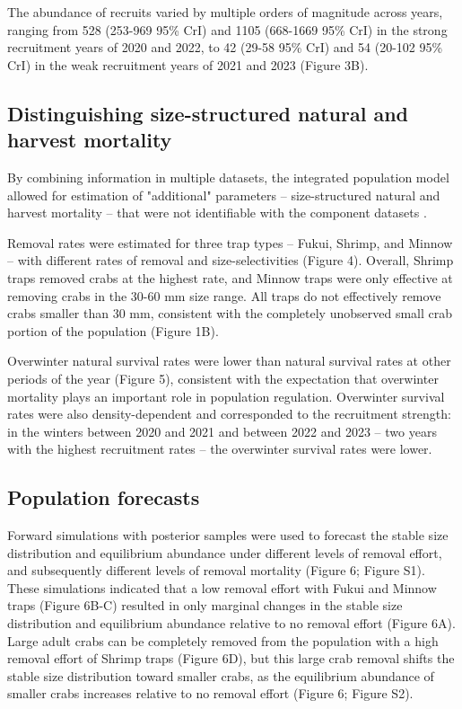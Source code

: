 \documentclass{article}
\begin{document}
The abundance of recruits varied by multiple orders of magnitude across years, ranging from 528 (253-969 95\% CrI) and 1105 (668-1669 95\% CrI) in the strong recruitment years of 2020 and 2022, to 42 (29-58 95\% CrI) and 54 (20-102 95\% CrI) in the weak recruitment years of 2021 and 2023 (Figure 3B).

\subsection{Distinguishing size-structured natural and harvest mortality}

By combining information in multiple datasets, the integrated population model allowed for estimation of "additional" parameters -- size-structured natural and harvest mortality -- that were not identifiable with the component datasets \parencite{riecke2019integrated}.

Removal rates were estimated for three trap types -- Fukui, Shrimp, and Minnow -- with different rates of removal and size-selectivities (Figure 4). Overall, Shrimp traps removed crabs at the highest rate, and Minnow traps were only effective at removing crabs in the 30-60 mm size range. All traps do not effectively remove crabs smaller than 30 mm, consistent with the completely unobserved small crab portion of the population (Figure 1B).

Overwinter natural survival rates were lower than natural survival rates at other periods of the year (Figure 5), consistent with the expectation that overwinter mortality plays an important role in population regulation. Overwinter survival rates were also density-dependent and corresponded to the recruitment strength: in the winters between 2020 and 2021 and between 2022 and 2023 -- two years with the highest recruitment rates -- the overwinter survival rates were lower.

\subsection{Population forecasts}

Forward simulations with posterior samples were used to forecast the stable size distribution and equilibrium abundance under different levels of removal effort, and subsequently different levels of removal mortality (Figure 6; Figure S1). These simulations indicated that a low removal effort with Fukui and Minnow traps (Figure 6B-C) resulted in only marginal changes in the stable size distribution and equilibrium abundance relative to no removal effort (Figure 6A). Large adult crabs can be completely removed from the population with a high removal effort of Shrimp traps (Figure 6D), but this large crab removal shifts the stable size distribution toward smaller crabs, as the equilibrium abundance of smaller crabs increases relative to no removal effort (Figure 6; Figure S2).
\end{document}
